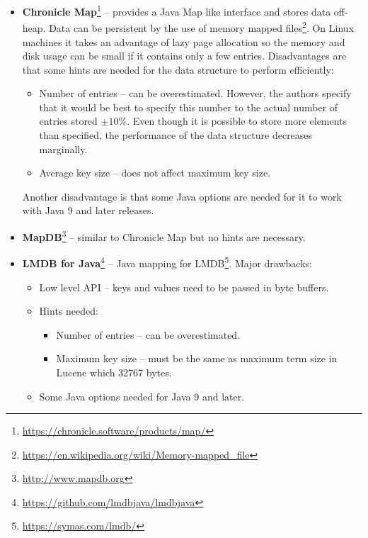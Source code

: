 \begin{itemize}
    \item \textbf{Chronicle Map}\footnote{\url{https://chronicle.software/products/map/}} – provides a Java Map like
    interface and stores data off-heap. Data can be persistent by the use of memory mapped
    files\footnote{\url{https://en.wikipedia.org/wiki/Memory-mapped\_file}}. On Linux machines it takes an advantage
    of lazy page allocation so the memory and disk usage can be small if it contains only a few entries.
    Disadvantages are that some hints are needed for the data structure to perform efficiently:
    \begin{itemize}
        \item Number of entries – can be overestimated. However, the authors specify that it would be best to specify
        this number to the actual number of entries stored $\pm 10\%$. Even though it is possible to store more elements
        than specified, the performance of the data structure decreases marginally.
        \item Average key size – does not affect maximum key size.
    \end{itemize}
    Another disadvantage is that some Java options are needed for it to work with Java 9 and later releases.

    \item \textbf{MapDB}\footnote{\url{http://www.mapdb.org}} – similar to Chronicle Map but no hints are necessary.

    \item \textbf{LMDB for Java}\footnote{\url{https://github.com/lmdbjava/lmdbjava}} – Java mapping for
    LMDB\footnote{\url{https://symas.com/lmdb/}}. Major drawbacks:
    \begin{itemize}
        \item Low level API – keys and values need to be passed in byte buffers.
        \item Hints needed:
            \begin{itemize}
                \item Number of entries – can be overestimated.
                \item Maximum key size – must be the same as maximum term size in Lucene which 32767 bytes.
            \end{itemize}
        \item Some Java options needed for Java 9 and later.
    \end{itemize}
\end{itemize}

